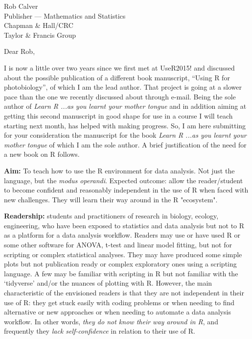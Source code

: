 \documentclass[a4paper]{scrlttr2}
\begin{document}
\begin{letter}{Rob Calver\\Publisher --- Mathematics and Statistics\\ Chapman \& Hall/CRC\\ Taylor \& Francis Group}

\opening{Dear Rob,}

I is now a little over two years since we first met at UseR2015! and discussed about the possible publication of a different book manuscript, ``Using R for photobiology'', of which I am the lead author. That project is going at a slower pace than the one we recently discussed about through e-mail. Being the sole author of \emph{Learn R ...as you learnt your mother tongue} and in addition aiming at getting this second manuscript in good shape for use in a course I will teach starting next month, has helped with making progress. So, I am here submitting for your consideration the manuscript for the book \emph{Learn R ...as you learnt your mother tongue} of which I am the sole author. A brief justification of the need for a new book on R follows.

\textbf{Aim:} To teach how to use the R environment for data analysis. Not just the language, but the \emph{modus operandi}. Expected outcome: allow the reader/student to become confident and reasonably independent in the use of R when faced with new challenges. They will learn their way around in the R "ecosystem".

\textbf{Readership:} students and practitioners of research in biology, ecology, engineering, who have been exposed to statistics and data analysis but not to R as a platform for a data analysis workflow. Readers may use or have used R or some other software for ANOVA, t-test and linear model fitting, but not for scripting or complex statistical analyses. They may have produced some simple plots but not publication ready or complex exploratory ones using a scripting language. A few may be familiar with scripting in R but not familiar with the `tidyverse' and/or the nuances of plotting with R. However, the main characteristic of the envisioned readers is that they are not independent in their use of R: they get stuck easily with coding problems or when needing to find alternative or new approaches or when needing to automate a data analysis workflow. In other words, \emph{they do not know their way around in R}, and frequently they \emph{lack self-confidence} in relation to their use of R.


\end{letter}
\end{document}
